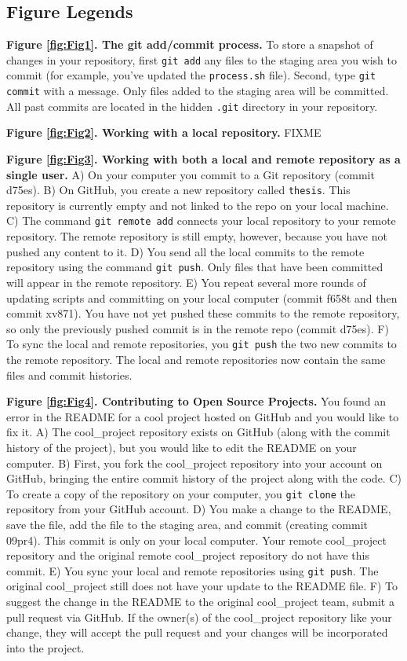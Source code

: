 \subsection{Figure Legends}

\textbf{Figure \ref{fig:Fig1}. The git add/commit process.}
To store a snapshot of changes in your repository, first \verb|git add| any files to the staging area you wish to commit (for example, you've updated the \verb|process.sh| file).
Second, type \verb|git commit| with a message. Only files added to the staging area will be committed.
All past commits are located in the hidden \verb|.git| directory in your repository.

\textbf{Figure \ref{fig:Fig2}. Working with a local repository.}
FIXME

\textbf{Figure \ref{fig:Fig3}. Working with both a local and remote repository as a single user.}
A) On your computer you commit to a Git repository (commit d75es).
B) On GitHub, you create a new repository called \verb|thesis|.
This repository is currently empty and not linked to the repo on your local machine.
C) The command \verb|git remote add| connects your local repository to your remote repository.
The remote repository is still empty, however, because you have not pushed any content to it.
D) You send all the local commits to the remote repository using the command \verb|git push|.
Only files that have been committed will appear in the remote repository.
E) You repeat several more rounds of updating scripts and committing on your local computer (commit f658t and then commit xv871).
You have not yet pushed these commits to the remote repository, so only the previously pushed commit is in the remote repo (commit d75es).
F) To sync the local and remote repositories, you \verb|git push| the two new commits to the remote repository.
The local and remote repositories now contain the same files and commit histories.

\textbf{Figure \ref{fig:Fig4}. Contributing to Open Source Projects.}
You found an error in the README for a cool project hosted on GitHub and you would like to fix it.
A) The cool\_project repository exists on GitHub (along with the commit history of the project), but you would like to edit the README on your computer.
B) First, you fork the cool\_project repository into your account on GitHub, bringing the entire commit history of the project along with the code.
C) To create a copy of the repository on your computer, you \verb|git clone| the repository from your GitHub account.
D) You make a change to the README, save the file, add the file to the staging area, and commit (creating commit 09pr4).
This commit is only on your local computer.
Your remote cool\_project repository and the original remote cool\_project repository do not have this commit.
E) You sync your local and remote repositories using \verb|git push|.
The original cool\_project still does not have your update to the README file.
F) To suggest the change in the README to the original cool\_project team, submit a pull request via GitHub.
If the owner(s) of the cool\_project repository like your change, they will accept the pull request and your changes will be incorporated into the project.

